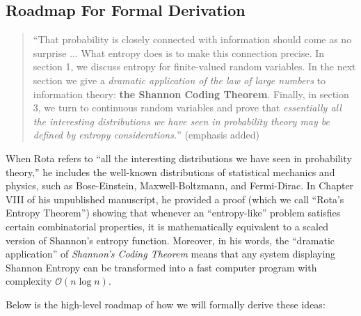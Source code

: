 \documentclass{report}
\begin{document}
\subsection*{Roadmap For Formal Derivation}
\begin{quote}
    ``That probability is closely connected with information should come as no surprise ... What 
    entropy does is to make this connection precise. In section 1, we discuss entropy for 
    finite-valued random variables. In the next section we give a \emph{dramatic application of the 
    law of large numbers} to information theory: \textbf{the Shannon Coding Theorem}. Finally, in 
    section 3, we turn to continuous random variables and prove that \emph{essentially all the 
    interesting distributions we have seen in probability theory may be defined by entropy 
    considerations.}''\cite{RotaBaclawski} (emphasis added)
\end{quote}

When Rota refers to ``all the interesting distributions we have seen in probability theory,'' he
includes the well-known distributions of statistical mechanics and physics, such as
Bose-Einstein, Maxwell-Boltzmann, and Fermi-Dirac. In Chapter VIII of his unpublished manuscript,
he provided a proof (which we call ``Rota's Entropy Theorem'') showing that whenever an
``entropy-like'' problem satisfies certain combinatorial properties, it is mathematically 
equivalent to a scaled version of Shannon's entropy function. Moreover, in his words, the 
``dramatic application'' of \emph{Shannon’s Coding Theorem} means that any system displaying 
Shannon Entropy can be transformed into a fast computer program with complexity 
\(\mathcal{O}(n \log n)\).

Below is the high-level roadmap of how we will formally derive these ideas:
\end{document}
